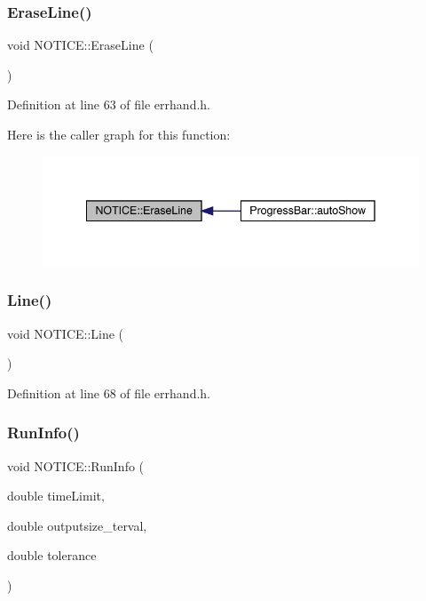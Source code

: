 \subsubsection{\texorpdfstring{Erase\+Line()}{EraseLine()}}
{\footnotesize\ttfamily void N\+O\+T\+I\+C\+E\+::\+Erase\+Line (\begin{DoxyParamCaption}{ }\end{DoxyParamCaption})\hspace{0.3cm}{\ttfamily [inline]}}



Definition at line 63 of file errhand.\+h.

Here is the caller graph for this function\+:\nopagebreak
\begin{figure}[H]
\begin{center}
\leavevmode
\includegraphics[width=342pt]{namespace_n_o_t_i_c_e_a46fcf4944d7c1d3cc4d821297b0e4bf8_icgraph}
\end{center}
\end{figure}
\mbox{\label{namespace_n_o_t_i_c_e_a9536e3b7bb1f9b6af83b1a5cdf3a56d3}} 
\subsubsection{\texorpdfstring{Line()}{Line()}}
{\footnotesize\ttfamily void N\+O\+T\+I\+C\+E\+::\+Line (\begin{DoxyParamCaption}{ }\end{DoxyParamCaption})\hspace{0.3cm}{\ttfamily [inline]}}



Definition at line 68 of file errhand.\+h.

\mbox{\label{namespace_n_o_t_i_c_e_ab85b7138c5f1deaeeedad94b7bad2477}} 
\subsubsection{\texorpdfstring{Run\+Info()}{RunInfo()}}
{\footnotesize\ttfamily void N\+O\+T\+I\+C\+E\+::\+Run\+Info (\begin{DoxyParamCaption}\item[{double}]{time\+Limit,  }\item[{double}]{outputsize\+\_\+terval,  }\item[{double}]{tolerance }\end{DoxyParamCaption})\hspace{0.3cm}{\ttfamily [inline]}}




